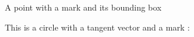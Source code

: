 
A point with a mark and its bounding box


\begin{center}
   
\end{center}

This is a circle with a tangent vector and a mark :

\begin{center}
    
\end{center}

